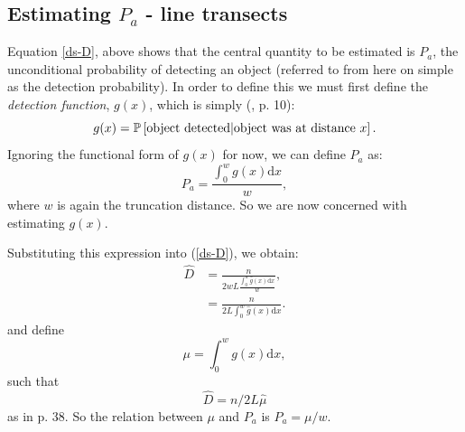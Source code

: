 \subsection{Estimating $P_a$ - line transects} 
Equation \ref{ds-D}, above shows that the central quantity to be estimated is $P_a$, the unconditional probability of detecting an object (referred to from here on simple as the detection probability). In order to define this we must first define the \textit{detection function}, $g(x)$, which is simply (\cite{IDS}, p. 10):
\begin{equation}
g(x)=\mathbb{P}\left[ \text{object detected} | \text{object was at distance } x \right].
\end{equation}
Ignoring the functional form of $g(x)$ for now, we can define $P_a$ as:
\begin{equation}
P_a = \frac{\int_0^w g(x) \text{d}x}{w},
\end{equation}
where $w$ is again the truncation distance. So we are now concerned with estimating $g(x)$.

Substituting this expression into (\ref{ds-D}), we obtain:
\begin{align}
\hat{D}&=\frac{n}{2wL \frac{\int_0^w \hat{g}(x) \text{d}x}{w}},\\
&=\frac{n}{2L\int_0^w \hat{g}(x) \text{d}x}.
\end{align}
and define
\begin{equation}
\mu = \int_0^w g(x) \text{d}x,
\end{equation}
such that
\begin{equation}
\hat{D}=n/2L\hat{\mu}
\end{equation}
as in \cite{IDS} p. 38. So the relation between $\mu$ and $P_a$ is $P_a=\mu/w$.

